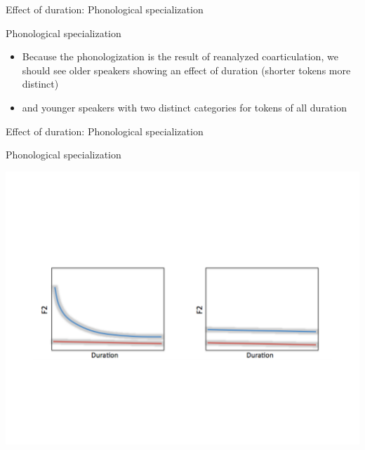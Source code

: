 \documentclass[hyperref={pdfpagelabels=false}]{beamer}
\begin{document}
\begin{frame}{Effect of duration: Phonological specialization}
	\begin{block}{Phonological specialization}
		\begin{itemize}
			\item Because the phonologization is the result of reanalyzed coarticulation, we should see older speakers showing an effect of duration (shorter tokens more distinct) \pause
			\item and younger speakers with two distinct categories for tokens of all duration
		\end{itemize}
	\end{block}	
\end{frame}

\begin{frame}{Effect of duration: Phonological specialization}
	\begin{block}{Phonological specialization}
	\begin{center}
	\includegraphics[trim=2cm 2cm 2cm 2cm, clip=false, width=.7\textwidth]{DurationEx.pdf}
	\end{center}
	\end{block}	
\end{frame}
\end{document}
